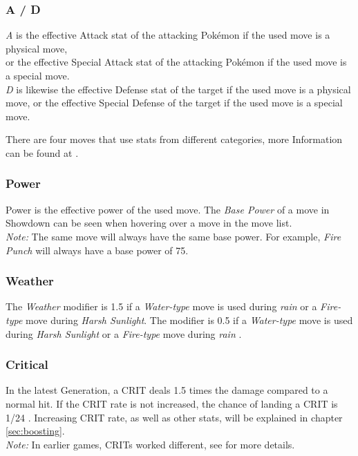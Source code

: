 \subsubsection{A / D}
\textit{A} is the effective Attack stat of the attacking Pokémon if the used move is a physical move,
 \\
or the effective Special Attack stat of the attacking Pokémon if the used move is a special move.
\\
\textit{D} is likewise the effective Defense stat of the target if the used move is a physical move,
or the effective Special Defense of the target if the used move is a special move\cite{Bulbapedia:Damage}.

There are four moves that use stats from different categories, more Information can be found
at \cite{Bulbapedia:MoveStatDifferentCategories}.

\subsubsection{Power}
Power is the effective power of the used move.
The \textit{Base Power} of a move in Showdown can be seen when hovering over a move in the move list. \\
\textit{Note:} The same move will always have the same base power. For example, \textit{Fire Punch} will
always have a base power of 75\cite{Bulbapedia:FirePunch}.

\subsubsection{Weather}
The \textit{Weather} modifier is 1.5 if a \textit{Water-type} move is used during \textit{rain} or a 
\textit{Fire-type} move during \textit{Harsh Sunlight}. The modifier is 0.5 if a \textit{Water-type} move
is used during \textit{Harsh Sunlight} or a \textit{Fire-type} move during \textit{rain} \cite{Bulbapedia:Damage}.

\subsubsection{Critical}
In the latest Generation, a \ac{CRIT} deals 1.5 times the damage compared to a normal hit.
If the \ac{CRIT} rate is not increased, the chance of landing a \ac{CRIT} is 1/24
\cite{Bulbapedia:CriticalHit}. Increasing \ac{CRIT} rate, as well as other stats, will 
be explained in chapter \ref{sec:boosting}. \\
\textit{Note:} In earlier games, \ac{CRIT}s worked different, see \cite{Bulbapedia:CriticalHit} for
more details.

